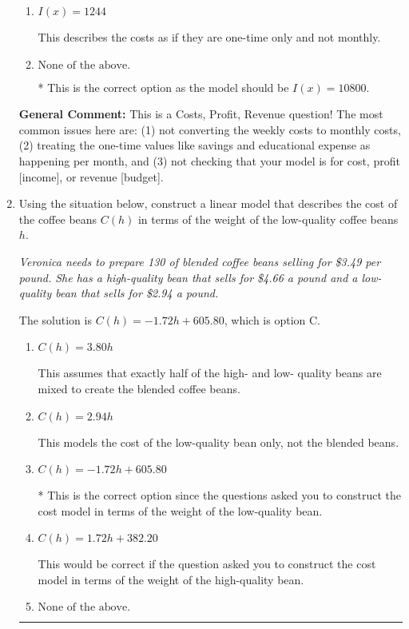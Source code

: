 \documentclass{extbook}[14pt]
\newcommand{\litem}[1]{\item #1

\rule{\textwidth}{0.4pt}}
\begin{document}
\begin{enumerate}
{\begin{enumerate}[label=\Alph*.]
This treats weekly expenses as month expenses rather than multiplying each weekly expense by 4 AND does not account for these expenses per month.
\item \( I(x) = 1244 \)

This describes the costs as if they are one-time only and not monthly.
\item \( \text{None of the above.} \)

* This is the correct option as the model should be $I(x) = 10800$.
\end{enumerate}

\textbf{General Comment:} This is a Costs, Profit, Revenue question! The most common issues here are: (1) not converting the weekly costs to monthly costs, (2) treating the one-time values like savings and educational expense as happening per month, and (3) not checking that your model is for cost, profit [income], or revenue [budget].
}
\litem{
Using the situation below, construct a linear model that describes the cost of the coffee beans $C(h)$ in terms of the weight of the low-quality coffee beans $h$.

\begin{center}
    \textit{ Veronica needs to prepare 130 of blended coffee beans selling for \$3.49 per pound. She has a high-quality bean that sells for \$4.66 a pound and a low-quality bean that sells for \$2.94 a pound. }
\end{center}
The solution is \( C(h) = -1.72 h + 605.80 \), which is option C.\begin{enumerate}[label=\Alph*.]
\item \( C(h) = 3.80 h \)

This assumes that exactly half of the high- and low- quality beans are mixed to create the blended coffee beans.
\item \( C(h) = 2.94 h \)

This models the cost of the low-quality bean only, not the blended beans.
\item \( C(h) = -1.72 h + 605.80 \)

* This is the correct option since the questions asked you to construct the cost model in terms of the weight of the low-quality bean.
\item \( C(h) = 1.72 h + 382.20 \)

This would be correct if the question asked you to construct the cost model in terms of the weight of the high-quality bean.
\item \( \text{None of the above.} \)


\end{enumerate}}
\end{enumerate}
\end{document}

